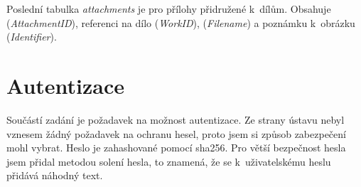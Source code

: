         Poslední tabulka \textit{attachments} je pro přílohy přidružené k~dílům. Obsahuje (\textit{AttachmentID}), referenci na dílo (\textit{WorkID}), (\textit{Filename}) a poznámku k~obrázku (\textit{Identifier}).
        
    \section{Autentizace} \label{autentizace}
        Součástí zadání je požadavek na možnost autentizace. Ze strany ústavu nebyl vznesem žádný požadavek na ochranu hesel, proto jsem si způsob zabezpečení mohl vybrat. Heslo je zahashované pomocí sha256. Pro větší bezpečnost hesla jsem přidal metodou solení hesla\cite{salt}, to znamená, že se k~uživatelskému heslu přidává náhodný text.
